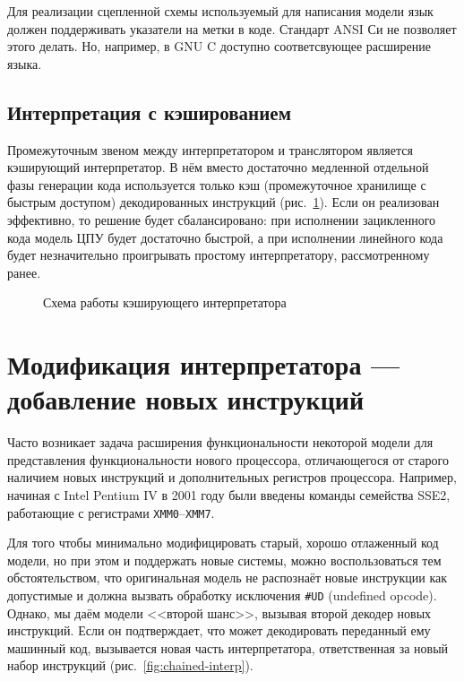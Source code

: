 Для реализации сцепленной схемы используемый для написания модели язык должен поддерживать указатели на метки в коде. Стандарт ANSI Си не позволяет этого делать. Но, например, в GNU C доступно соответсвующее расширение языка.

\subsection{Интерпретация с кэшированием}

Промежуточным звеном между интерпретатором и транслятором является кэширующий интерпретатор. В нём вместо достаточно медленной отдельной фазы генерации кода используется только кэш (промежуточное хранилище с быстрым доступом) декодированных инструкций (рис.~\ref{fig:cached-interp}). Если он реализован эффективно, то решение будет сбалансировано: при исполнении зацикленного кода модель ЦПУ будет достаточно быстрой, а при исполнении линейного кода будет незначительно проигрывать простому интерпретатору, рассмотренному ранее.

\begin{figure}[htb]
    \centering
    \caption{Схема работы кэширующего интерпретатора}
    \label{fig:cached-interp}
\end{figure}

\section[Модификация интерпретатора]{Модификация интерпретатора --- добавление новых инструкций}

Часто возникает задача расширения функциональности некоторой модели для представления функциональности нового процессора, отличающегося от старого наличием новых инструкций и дополнительных регистров процессора. Например, начиная с Intel Pentium IV в 2001 году были введены команды семейства SSE2, работающие с регистрами \texttt{XMM0}--\texttt{XMM7}.

Для того чтобы минимально модифицировать старый, хорошо отлаженный код модели, но при этом и поддержать новые системы, можно воспользоваться тем обстоятельством, что оригинальная модель не распознаёт новые инструкции как допустимые и должна вызвать обработку исключения \texttt{\#UD} (\abbr undefined opcode). Однако, мы даём модели <<второй шанс>>, вызывая второй декодер новых инструкций. Если он подтверждает, что может декодировать переданный ему машинный код, вызывается новая часть интерпретатора, ответственная за новый набор инструкций (рис.~\ref{fig:chained-interp}). 

